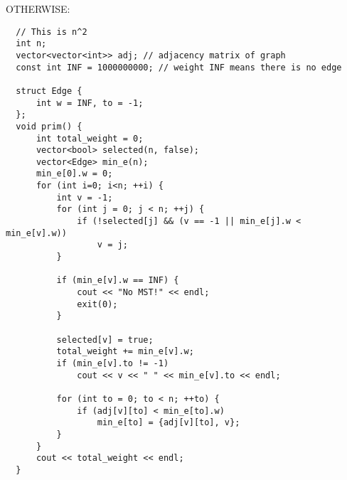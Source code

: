 OTHERWISE:

\begin{lstlisting}
  // This is n^2
  int n;
  vector<vector<int>> adj; // adjacency matrix of graph
  const int INF = 1000000000; // weight INF means there is no edge

  struct Edge {
      int w = INF, to = -1;
  };
  void prim() {
      int total_weight = 0;
      vector<bool> selected(n, false);
      vector<Edge> min_e(n);
      min_e[0].w = 0;
      for (int i=0; i<n; ++i) {
          int v = -1;
          for (int j = 0; j < n; ++j) {
              if (!selected[j] && (v == -1 || min_e[j].w < min_e[v].w))
                  v = j;
          }

          if (min_e[v].w == INF) {
              cout << "No MST!" << endl;
              exit(0);
          }

          selected[v] = true;
          total_weight += min_e[v].w;
          if (min_e[v].to != -1)
              cout << v << " " << min_e[v].to << endl;

          for (int to = 0; to < n; ++to) {
              if (adj[v][to] < min_e[to].w)
                  min_e[to] = {adj[v][to], v};
          }
      }
      cout << total_weight << endl;
  }
\end{lstlisting}
